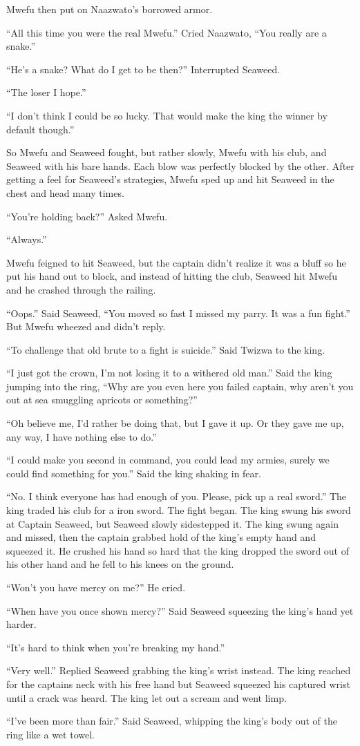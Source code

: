 Mwe\-fu then put on Naa\-zwa\-to's borrowed armor.

``All this time you were the real Mwe\-fu.'' Cried Naa\-zwa\-to, ``You really are a snake.''

``He's a snake? What do I get to be then?'' Interrupted Seaweed.

``The loser I hope.''

``I don't think I could be so lucky. That would make the king the winner by default though.''

So Mwe\-fu and Seaweed fought, but rather slowly, Mwe\-fu with his club, and Seaweed with his bare hands.
Each blow was perfectly blocked by the other. After getting a feel for Seaweed's strategies, Mwe\-fu sped up and hit Seaweed in the chest and head many times.

``You're holding back?'' Asked Mwe\-fu.

``Always.''

Mwe\-fu feigned to hit Seaweed, but the captain didn't realize it was a bluff so he put his hand out to block, and instead of hitting the club, Seaweed hit Mwe\-fu and he crashed through the railing.

``Oops.'' Said Seaweed, ``You moved so fast I missed my parry. It was a fun fight.'' But Mwe\-fu wheezed and didn't reply.

``To challenge that old brute to a fight is suicide.'' Said Twi\-zwa to the king.

``I just got the crown, I'm not losing it to a withered old man.'' Said the king jumping into the ring, ``Why are you even here you failed captain, why aren't you out at sea smuggling apricots or something?''

``Oh believe me, I'd rather be doing that, but I gave it up. Or they gave me up, any way, I have nothing else to do.''

``I could make you second in command, you could lead my armies, surely we could find something for you.'' Said the king shaking in fear.

``No. I think everyone has had enough of you. Please, pick up a real sword.'' The king traded his club for a iron sword. The fight began. The king swung his sword at Captain Seaweed, but Seaweed slowly sidestepped it. The king swung again and missed, then the captain grabbed hold of the king's empty hand and squeezed it. He crushed his hand so hard that the king dropped the sword out of his other hand and he fell to his knees on the ground.

``Won't you have mercy on me?'' He cried.

``When have you once shown mercy?'' Said Seaweed squeezing the king's hand yet harder.

``It's hard to think when you're breaking my hand.''


``Very well.'' Replied Seaweed grabbing the king's wrist instead. The king reached for the captains neck with his free hand but Seaweed squeezed his captured wrist until a crack was heard. The king let out a scream and went limp.

``I've been more than fair.'' Said Seaweed, whipping the king's body out of the ring like a wet towel.
